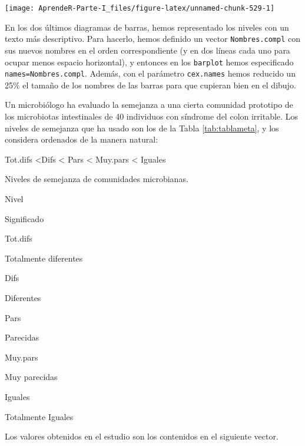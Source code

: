 \documentclass[]{book}
\theoremstyle{definition}
\theoremstyle{definition}
\theoremstyle{definition}
\theoremstyle{remark}
\let\BeginKnitrBlock\begin \let\EndKnitrBlock\end
\begin{document}
\begin{center}\texttt{[image: AprendeR-Parte-I\_files/figure-latex/unnamed-chunk-529-1]} \end{center}

En los dos últimos diagramas de barras, hemos representado los niveles con un texto más descriptivo. Para hacerlo, hemos definido un vector \texttt{Nombres.compl} con sus nuevos nombres en el orden correspondiente (y en dos líneas cada uno para ocupar menos espacio horizontal), y entonces en los \texttt{barplot} hemos especificado \texttt{names=Nombres.compl}. Además, con el parámetro \texttt{cex.names} hemos reducido un 25\% el tamaño de los nombres de las barras para que cupieran bien en el dibujo.

\BeginKnitrBlock{example}
\protect\hypertarget{exm:ex1706}{}{\label{exm:ex1706} }Un microbiólogo ha evaluado la semejanza a una cierta comunidad prototipo de los microbiotas intestinales de 40 individuos con síndrome del colon irritable. Los niveles de semejanza que ha usado son los de la Tabla \ref{tab:tablameta}, y los considera ordenados de la manera natural:
\EndKnitrBlock{example}

Tot.difs \textless{}Difs \textless{} Pars \textless{} Muy.pars \textless{} Iguales

\label{tab:tablameta}Niveles de semejanza de comunidades microbianas.

Nivel

Significado

Tot.difs

Totalmente diferentes

Difs

Diferentes

Pars

Parecidas

Muy.pars

Muy parecidas

Iguales

Totalmente Iguales

Los valores obtenidos en el estudio son los contenidos en el siguiente vector.
\end{document}
